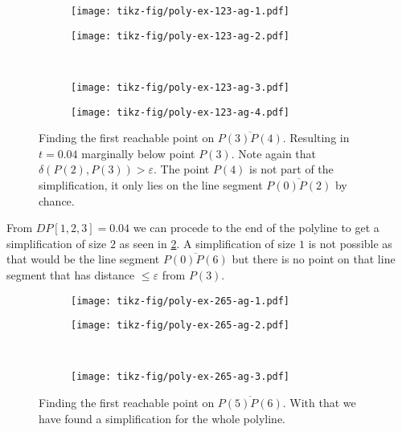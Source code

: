 \begin{figure}
  \centering
  \begin{subfigure}[b]{0.4\textwidth}
    \texttt{[image: tikz-fig/poly-ex-123-ag-1.pdf]}
  \end{subfigure}
  \begin{subfigure}[b]{0.4\textwidth}
    \texttt{[image: tikz-fig/poly-ex-123-ag-2.pdf]}
  \end{subfigure}\\
  \begin{subfigure}[b]{0.4\textwidth}
    \texttt{[image: tikz-fig/poly-ex-123-ag-3.pdf]}
  \end{subfigure}
  \begin{subfigure}[b]{0.4\textwidth}
    \texttt{[image: tikz-fig/poly-ex-123-ag-4.pdf]}
  \end{subfigure}
  \caption{Finding the first reachable point on \(\overline{P(3)P(4)}\). Resulting in \(t = 0.04\) marginally below point \(P(3)\). Note again that \(\delta(P(2), P(3)) > \varepsilon\). The point \(P(4)\) is not part of the simplification, it only lies on the line segment \(\overline{P(0)P(2)}\) by chance.}
  \label{fig:poly-ex-123-ag}
\end{figure}

From \(DP[1,2,3] = 0.04\) we can procede to the end of the polyline to get a simplification of size \(2\) as seen in \cref{fig:poly-ex-265-ag}. A simplification of size \(1\) is not possible as that would be the line segment \(\overline{P(0)P(6)}\) but there is no point on that line segment that has distance \(\leq \varepsilon\) from \(P(3)\). 

\begin{figure}
  \centering
  \begin{subfigure}[b]{0.4\textwidth}
    \texttt{[image: tikz-fig/poly-ex-265-ag-1.pdf]}
  \end{subfigure}
  \begin{subfigure}[b]{0.4\textwidth}
    \texttt{[image: tikz-fig/poly-ex-265-ag-2.pdf]}
  \end{subfigure}\\
  \begin{subfigure}[b]{0.4\textwidth}
    \texttt{[image: tikz-fig/poly-ex-265-ag-3.pdf]}
  \end{subfigure}
  \caption{Finding the first reachable point on \(\overline{P(5)P(6)}\). With that we have found a simplification for the whole polyline.}
  \label{fig:poly-ex-265-ag}
\end{figure}

